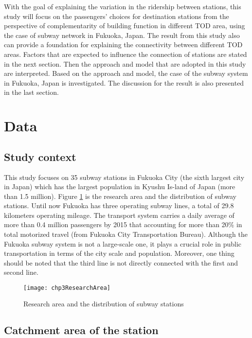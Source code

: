 %
With the goal of explaining the variation in the ridership between stations, this study will focus on the passengers’ choices for destination stations from the perspective of complementarity of building function in different TOD area, using the case of subway network in Fukuoka, Japan. The result from this study also can provide a foundation for explaining the connectivity between different TOD areas. Factors that are expected to influence the connection of stations are stated in the next section. Then the approach and model that are adopted in this study are interpreted. Based on the approach and model, the case of the subway system in Fukuoka, Japan is investigated. The discussion for the result is also presented in the last section.

%
\section{Data}

%
\subsection{Study context}
\indent

%
This study focuses on 35 subway stations in Fukuoka City (the sixth largest city in Japan) which has the largest population in Kyushu Is-land of Japan (more than 1.5 million). Figure \ref{fig:chp3:ResearchArea} is the research area and the distribution of subway stations. Until now Fukuoka has three operating subway lines, a total of 29.8 kilometers operating mileage. The transport system carries a daily average of more than 0.4 million passengers by 2015 that accounting for more than 20\% in total motorized travel (from Fukuoka City Transportation Bureau). Although the Fukuoka subway system is not a large-scale one, it plays a crucial role in public transportation in terms of the city scale and population. Moreover, one thing should be noted that the third line is not directly connected with the first and second line.

\begin{figure}[htbp]
	\centering
	\texttt{[image: chp3ResearchArea]}
	\caption{Research area and the distribution of subway stations}
	\label{fig:chp3:ResearchArea}
\end{figure}

%
\subsection{Catchment area of the station}
\indent

